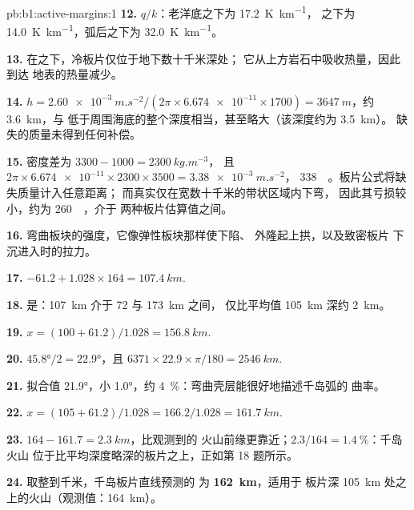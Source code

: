 \begin{solution}{pb:b1:active-margins:1}
\textbf{12.} $q/k$：老洋底之下为 \qty{17.2}{K.km^{-1}}，
之下为 \qty{14.0}{K.km^{-1}}，弧后之下为
\qty{32.0}{K.km^{-1}}。

\textbf{13.} 在之下，冷板片仅位于地下数十千米深处；
它从上方岩石中吸收热量，因此到达
地表的热量减少。

\textbf{14.} $h = \qty{2.60e-3}{m.s^{-2}}/(2\pi\times\num{6.674e-11}\times1700)
= \qty{3647}{m}$，约 \qty{3.6}{km}，与
低于周围海底的整个深度相当，甚至略大（该深度约为 \qty{3.5}{km}）。
缺失的质量未得到任何补偿。

\textbf{15.} 密度差为 $3300 - 1000 = \qty{2300}{kg.m^{-3}}$，
且 $2\pi\times\num{6.674e-11}\times2300\times3500 = \qty{3.38e-3}{m.s^{-2}}$，
\qty{338}{\milli\gal}。板片公式将缺失质量计入任意距离；
而真实仅在宽数十千米的带状区域内下弯，
因此其亏损较小，约为 \qty{260}{\milli\gal}，介于
两种板片估算值之间。

\textbf{16.} 弯曲板块的强度，它像弹性板块那样使下陷、
外隆起上拱，以及致密板片
下沉进入时的拉力。

\textbf{17.} $-61.2 + 1.028\times164 = \qty{107.4}{km}$.

\textbf{18.} 是：\qty{107}{km} 介于 72 与 \qty{173}{km} 之间，
仅比平均值 \qty{105}{km} 深约 \qty{2}{km}。

\textbf{19.} $x = (100 + 61.2)/1.028 = \qty{156.8}{km}$.

\textbf{20.} $\ang{45.8}/2 = \ang{22.9}$，且
$6371\times22.9\times\pi/180 = \qty{2546}{km}$.

\textbf{21.} 拟合值 \ang{21.9}，小 \ang{1.0}，约
\qty{4}{\percent}：弯曲壳层能很好地描述千岛弧的
曲率。

\textbf{22.} $x = (105 + 61.2)/1.028 = 166.2/1.028 = \qty{161.7}{km}$.

\textbf{23.} $164 - 161.7 = \qty{2.3}{km}$，比观测到的
火山前缘更靠近；$2.3/164 = \qty{1.4}{\percent}$：千岛火山
位于比平均深度略深的板片之上，正如第 18 题所示。

\textbf{24.} 取整到千米，千岛板片直线预测的
为 \textbf{\qty[text-series-to-math=true]{162}{km}}，适用于
板片深 \qty{105}{km} 处之上的火山（观测值：\qty{164}{km}）。
\end{solution}
